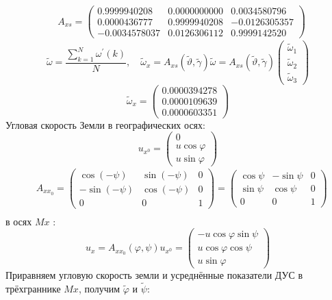 \documentclass[a4paper,14pt]{article}
\theoremstyle{plain} %
\theoremstyle{definition} %
\theoremstyle{remark} %
\begin{document}
{$$
    \begin{aligned}
         & A_{x s}=\left(\begin{array}{ccc}0.9999940208 & 0.0000000000 & 0.0034580796
             \\0.0000436777 & 0.9999940208 & -0.0126305357 \\
             -0.0034578037     & 0.0126306112 & 0.9999142520
            \end{array}\right)
    \end{aligned}
$$
$$
    \widetilde{\omega}=\frac{\sum_{k=1}^{N} \omega^{\prime}(k)}{N}, \quad \widetilde{\omega}_{x}=A_{x s}(\widetilde{\vartheta}, \widetilde{\gamma}) \widetilde{\omega}=A_{x s}(\widetilde{\vartheta}, \widetilde{\gamma})\left(\begin{array}{c}
            \widetilde{\omega}_{1} \\
            \widetilde{\omega}_{2} \\
            \widetilde{\omega}_{3}
        \end{array}\right)
$$
$$
    \widetilde{\omega}_{x}=\left(\begin{array}{c}
            0.0000394278 \\
            0.0000109639 \\
            0.0000603351
        \end{array}\right)
$$
Угловая скорость Земли в географических осях:
$$
    u_{x^{0}}=\left(\begin{array}{c}
            0              \\
            u \cos \varphi \\
            u \sin \varphi
        \end{array}\right)
$$
$$
    \begin{aligned}
         & A_{x x_{0}}=\left(\begin{array}{ccc}\cos (-\psi) & \sin (-\psi) & 0 \\-\sin (-\psi) & \cos (-\psi) & 0 \\0 & 0 & 1\end{array}\right)=\left(\begin{array}{ccc}\cos \psi & -\sin \psi & 0 \\\sin \psi & \cos \psi & 0 \\0 & 0 & 1\end{array}\right) \\
    \end{aligned}
$$
в осях $M x$ :
$$
    u_{x}=A_{x x_{0}}(\varphi, \psi) u_{x^{0}}=\left(\begin{array}{c}
            -u \cos \varphi \sin \psi \\
            u \cos \varphi \cos \psi  \\
            u \sin \varphi
        \end{array}\right)
$$
Приравняем угловую скорость земли и усреднённые показатели ДУС в трёхграннике $M x$, получим  $\widetilde{\varphi}$ и $\widetilde{\psi}:$

}
\end{document}
